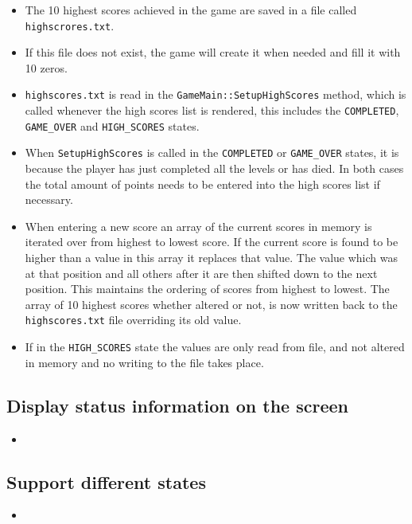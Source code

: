 \begin{itemize}
	\item The 10 highest scores achieved in the game are saved in a file called \verb!highscrores.txt!.
	\item If this file does not exist, the game will create it when needed and fill it with 10 zeros.
	\item \verb!highscores.txt! is read in the \verb!GameMain::SetupHighScores! method, which is called whenever the high scores list is rendered, this includes the \verb!COMPLETED!, \verb!GAME_OVER! and \verb!HIGH_SCORES! states.
	\item When \verb!SetupHighScores! is called in the \verb!COMPLETED! or \verb!GAME_OVER! states, it is because the player has just completed all the levels or has died. In both cases the total amount of points needs to be entered into the high scores list if necessary.
	\item When entering a new score an array of the current scores in memory is iterated over from highest to lowest score. If the current score is found to be higher than a value in this array it replaces that value. The value which was at that position and all others after it are then shifted down to the next position. This maintains the ordering of scores from highest to lowest. The array of 10 highest scores whether altered or not, is now written back to the \verb!highscores.txt! file overriding its old value.
	\item If in the \verb!HIGH_SCORES! state the values are only read from file, and not altered in memory and no writing to the file takes place.
\end{itemize}

\subsection{Display status information on the screen}

\begin{itemize}
	\item
\end{itemize}

\subsection{Support different states}

\begin{itemize}
	\item
\end{itemize}